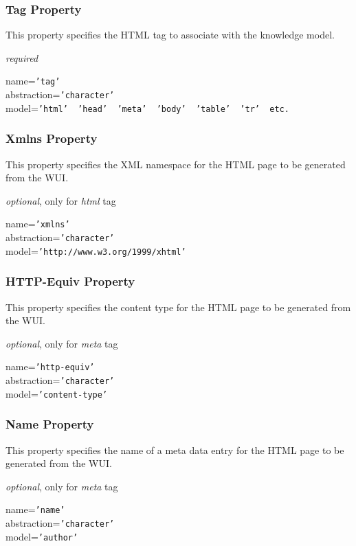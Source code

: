 \subsubsection{Tag Property}

This property specifies the HTML tag to associate with the knowledge model.

\emph{required}

name=\texttt{'tag'}\\
abstraction=\texttt{'character'}\\
model=\texttt{'html' \vline\ 'head' \vline\ 'meta' \vline\ 'body' \vline\ 'table' \vline\ 'tr' \vline\ etc.}

\subsubsection{Xmlns Property}

This property specifies the XML namespace for the HTML page to be generated
from the WUI.

\emph{optional}, only for \emph{html} tag

name=\texttt{'xmlns'}\\
abstraction=\texttt{'character'}\\
model=\texttt{'http://www.w3.org/1999/xhtml'}

\subsubsection{HTTP-Equiv Property}

This property specifies the content type for the HTML page to be generated from
the WUI.

\emph{optional}, only for \emph{meta} tag

name=\texttt{'http-equiv'}\\
abstraction=\texttt{'character'}\\
model=\texttt{'content-type'}

\subsubsection{Name Property}

This property specifies the name of a meta data entry for the HTML page to be
generated from the WUI.

\emph{optional}, only for \emph{meta} tag

name=\texttt{'name'}\\
abstraction=\texttt{'character'}\\
model=\texttt{'author'}

